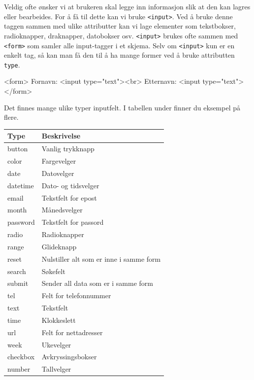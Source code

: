 \documentclass[%
oneside,                 %
final,                   %
10pt]{article}
\newenvironment{notice_mdfboxadmon}[1][]{
\begin{notice_mdfboxmdframed}[frametitle=#1]
}
{
\end{notice_mdfboxmdframed}
}
\begin{document}
Veldig ofte ønsker vi at brukeren skal legge inn informasjon slik at
den kan lagres eller bearbeides. For å få til dette kan vi bruke
\texttt{<input>}. Ved å bruke denne taggen sammen med ulike attributter kan vi
lage elementer som tekstbokser, radioknapper, draknapper, datobokser
osv. \texttt{<input>} brukes ofte sammen med \texttt{<form>} som samler alle
input-tagger i et skjema. Selv om \texttt{<input>} kun er en enkelt tag, så
kan man få den til å ha mange former ved å bruke attributten \texttt{type}.


\begin{notice_mdfboxadmon}
\bhtml
<form>
Fornavn: <input type="text"><br>
Etternavn: <input type="text">
</form>
\ehtml
\end{notice_mdfboxadmon}



Det finnes mange ulike typer inputfelt. I tabellen under finner du
eksempel på flere.


\providecommand{\specialcell}[2][c]{\begin{tabular}[c]{@{}#1@{}}#2\end{tabular}}
{\footnotesize\renewcommand{\arraystretch}{1.2}
\vspace{2em}
\begin{tabular}{|l|l|}
\hline
\textbf{Type} & \textbf{Beskrivelse}\\
\hline
button & Vanlig trykknapp\\
\hline
color & Fargevelger\\
\hline
date & Datovelger\\
\hline
datetime & Dato- og tidsvelger\\
\hline
email & Tekstfelt for epost\\
\hline
month & Månedsvelger\\
\hline
password & Tekstfelt for passord\\
\hline
radio & Radioknapper\\
\hline
range & Glideknapp\\
\hline
reset & Nulstiller alt som er inne i samme form\\
\hline
search & Søkefelt\\
\hline
submit & Sender all data som er i samme form\\
\hline
tel & Felt for telefonnummer\\
\hline
text & Tekstfelt\\
\hline
time & Klokkeslett\\
\hline
url & Felt for nettadresser\\
\hline
week & Ukevelger\\
\hline
checkbox & Avkryssingsbokser\\
\hline
number & Tallvelger\\
\hline
\end{tabular}
}\renewcommand{\arraystretch}{1.0}
\\
\end{document}
